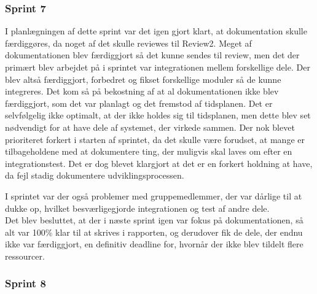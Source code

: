 \documentclass[a4paper,12pt,fleqn,oneside]{article}
\begin{document}
\subsubsection{Sprint 7}
I planlægningen af dette sprint var det igen gjort klart, at dokumentation skulle færdiggøres, da noget af det skulle reviewes til Review2. Meget af dokumentationen blev færdiggjort så det kunne sendes til review, men det der primært blev arbejdet på i sprintet var integrationen mellem forskellige dele. Der blev altså færdiggjort, forbedret og fikset forskellige moduler så de kunne integreres. Det kom så på bekostning af at al dokumentationen ikke blev færdiggjort, som det var planlagt og det fremstod af tidsplanen. Det er selvfølgelig ikke optimalt, at der ikke holdes sig til tidsplanen, men dette blev set nødvendigt for at have dele af systemet, der virkede sammen. Der nok blevet prioriteret forkert i starten af sprintet, da det skulle være forudset, at mange er tilbageholdene med at dokumentere ting, der muligvis skal laves om efter en integrationstest. Det er dog blevet klargjort at det er en forkert holdning at have, da fejl stadig dokumentere udviklingsprocessen.

I sprintet var der også problemer med gruppemedlemmer, der var dårlige til at dukke op, hvilket besværligegjorde integrationen og test af andre dele. \\

Det blev besluttet, at der i næste sprint igen var fokus på dokumentationen, så alt var 100\% klar til at skrives i rapporten, og derudover fik de dele, der endnu ikke var færdiggjort, en definitiv deadline for, hvornår der ikke blev tildelt flere ressourcer.
\subsubsection{Sprint 8}
\end{document}
